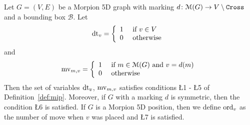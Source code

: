 \begin{lemma}
  \label{lem:graphs}
  Let $G = (V, E)$ be a Morpion 5D graph with marking $d \colon \mathcal{M}(G) \to V \setminus \texttt{Cross}$
  and a bounding box $\mathcal{B}$.
  Let
  \[
    \operatorname{dt}_v = 
    \left\{
    \begin{array}{ll}
      1 & \text{ if } v \in V \\
      0 & \text{ otherwise }
    \end{array}
    \right.
  \]
  and 
  \[
    \operatorname{mv}_{m, v} = 
    \left\{
    \begin{array}{ll}
      1 & \text{ if } m \in \mathcal{M}(G) \text{ and } v = d(m) \\
      0 & \text{ otherwise }
    \end{array}
    \right.
  \]
  Then the set of variables $\operatorname{dt}_v$, $\operatorname{mv}_{m, v}$ satisfies conditions \L{1} - \L{5} of Definition~\ref{def:mip}.
  Moreover, if $G$ with a marking $d$ is symmetric, then the condition \L{6} is satisfied. If $G$ is a Morpion 5D position, then
we define $\operatorname{ord}_v$ as the number of move when $v$ was placed and \L{7} is satisfied.   
\end{lemma}
